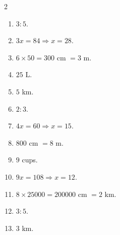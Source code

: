 \documentclass[11pt]{article}
\begin{document}
\begin{keybox}
\begin{multicols}{2}
\small
\begin{enumerate}[leftmargin=*,itemsep=3pt]
  \item $3:5$.
  \item $3x=84\Rightarrow x=28$.
  \item $6\times50=300$ cm $=3$ m.
  \item $25$ L.
  \item $5$ km.
  \item $2:3$.
  \item $4x=60\Rightarrow x=15$.
  \item $800$ cm $=8$ m.
  \item $9$ cups.
  \item $9x=108\Rightarrow x=12$.
  \item $8\times25000=200000$ cm $=2$ km.
  \item $3:5$.
  \item $3$ km.
\end{enumerate}
\end{multicols}
\end{keybox}
\end{document}
